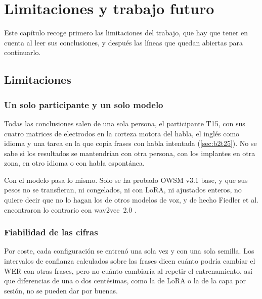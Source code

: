 
\chapter{Limitaciones y trabajo futuro}
\label{cap:limitaciones}

Este capítulo recoge primero las limitaciones del trabajo, que hay que tener en cuenta al leer sus conclusiones, y después las líneas que quedan abiertas para continuarlo.

\section{Limitaciones}
\label{sec:limitaciones}

\subsection{Un solo participante y un solo modelo}

Todas las conclusiones salen de una sola persona, el participante T15, con sus cuatro matrices de electrodos en la corteza motora del habla, el inglés como idioma y una tarea en la que copia frases con habla intentada (\cref{sec:b2t25}). No se sabe si los resultados se mantendrían con otra persona, con los implantes en otra zona, en otro idioma o con habla espontánea.

Con el modelo pasa lo mismo. Solo se ha probado OWSM v3.1 base, y que sus pesos no se transfieran, ni congelados, ni con LoRA, ni ajustados enteros, no quiere decir que no lo hagan los de otros modelos de voz, y de hecho Fiedler et al. encontraron lo contrario con wav2vec~2.0 \cite{fiedler2025wav2vec2brain}.

\subsection{Fiabilidad de las cifras}

Por coste, cada configuración se entrenó una sola vez y con una sola semilla. Los intervalos de confianza calculados sobre las frases dicen cuánto podría cambiar el WER con otras frases, pero no cuánto cambiaría al repetir el entrenamiento, así que diferencias de una o dos centésimas, como la de LoRA o la de la capa por sesión, no se pueden dar por buenas.

